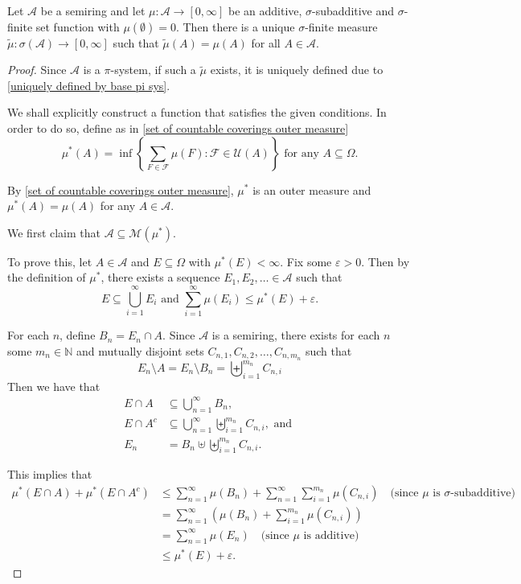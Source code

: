 \begin{theorem}
\label{MeasureExtensionTh}
    Let $\mathcal{A}$ be a semiring and let $\mu:\mathcal{A}\to[0,\infty]$ be an additive, $\sigma$-subadditive and $\sigma$-finite set function with $\mu(\emptyset)=0$. Then there is a unique $\sigma$-finite measure $\tilde\mu:\sigma(\mathcal{A})\to[0,\infty]$ such that $\tilde\mu(A)=\mu(A)$ for all $A\in\mathcal{A}$.
\end{theorem}
\begin{proof}
    Since $\mathcal{A}$ is a $\pi$-system, if such a $\tilde\mu$ exists, it is uniquely defined due to \cref{uniquely defined by base pi sys}.
    
    We shall explicitly construct a function that satisfies the given conditions. In order to do so, define as in \cref{set of countable coverings outer measure}
    $$\mu^*(A)=\inf\left\{\sum_{F\in\mathcal{F}}\mu(F) : \mathcal{F}\in\mathcal{U}(A) \right\}\text{ for any $A\subseteq\Omega$.}$$
    
    By \cref{set of countable coverings outer measure}, $\mu^*$ is an outer measure and $\mu^*(A)=\mu(A)$ for any $A\in\mathcal{A}$.
    
    \vspace{2mm}
    We first claim that $\mathcal{A}\subseteq\mathcal{M}(\mu^*)$.
    
    To prove this, let $A\in\mathcal{A}$ and $E\subseteq\Omega$ with $\mu^*(E)<\infty$. Fix some $\varepsilon>0$. Then by the definition of $\mu^*$, there exists a sequence $E_1,E_2,\ldots\in\mathcal{A}$ such that
    $$E\subseteq\bigcup_{i=1}^\infty E_i\text{ and }\sum_{i=1}^\infty \mu(E_i)\leq \mu^*(E)+\varepsilon.$$
    
    For each $n$, define $B_n=E_n\cap A$. Since $\mathcal{A}$ is a semiring, there exists for each $n$ some $m_n\in\mathbb{N}$ and mutually disjoint sets $C_{n, 1},C_{n, 2},\ldots,C_{n, m_n}$ such that
    $$E_n\setminus A = E_n\setminus B_n = \biguplus_{i=1}^{m_n}C_{n, i}$$
    Then we have that
    \begin{align*}
        E\cap A &\subseteq \bigcup_{n=1}^\infty B_n, \\
        E\cap A^c &\subseteq \bigcup_{n=1}^\infty\biguplus_{i=1}^{m_n}C_{n,i},\text{ and } \\
        E_n &= B_n\uplus\biguplus_{i=1}^{m_n}C_{n,i}.
    \end{align*}
    
    This implies that
    \begin{align*}
        \mu^*(E\cap A) + \mu^*(E\cap A^c) &\leq \sum_{n=1}^\infty\mu(B_n) + \sum_{n=1}^\infty\sum_{i=1}^{m_n}\mu(C_{n,i}) \quad\text{(since $\mu$ is $\sigma$-subadditive)} \\
        &= \sum_{n=1}^\infty\left(\mu(B_n) + \sum_{i=1}^{m_n}\mu(C_{n,i})\right) \\
        &= \sum_{n=1}^\infty \mu(E_n) \quad\text{(since $\mu$ is additive)} \\
        &   \leq \mu^*(E) + \varepsilon.
    \end{align*}
    

\end{proof}
